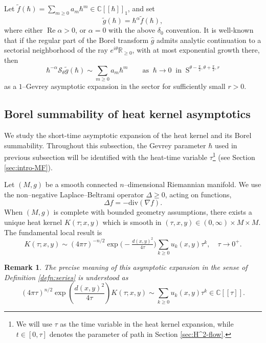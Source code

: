 \documentclass[11pt]{amsart}
\theoremstyle{plain}
\newtheorem{rmk}[thm]{Remark}
\theoremstyle{definition}
\newcommand{\R}{\mathbb{R}}
\newcommand{\C}{\mathbb{C}}
\begin{document}
Let $\widetilde f(\hbar)=\sum\limits_{m\ge0}a_m\hbar^m\in\C[[\hbar]]_1$, and set
\begin{equation*}
\widetilde g(\hbar)=\hbar^\alpha\widetilde f(\hbar),
\end{equation*}
where either $\operatorname{Re}\alpha>0$, or $\alpha=0$ with the above
$\delta_0$ convention. It is well-known that if the regular part of the
Borel transform $\widehat g$ admits analytic continuation to a sectorial
neighborhood of the ray $e^{i\theta}\R_{\ge0}$, with at most
exponential growth there, then 
\begin{equation*}
\hbar^{-\alpha}\mathcal S_\theta\widetilde g(\hbar) \sim \sum_{m\ge0}a_m\hbar^m  \quad \quad \text{as } \ \hbar\rightarrow 0 \ \text{ in }\  \text{S}^{\theta-\frac{\pi}{2},\theta+\frac{\pi}2,r}
\end{equation*}
as a $1$--Gevrey asymptotic expansion in the sector for sufficiently small $r>0$.





\subsection{Borel summability of heat kernel asymptotics}\label{subsec:proof-borel-summability} We study the short-time asymptotic expansion of the heat kernel and its Borel summability. Throughout this subsection, the Gevrey parameter $\hbar$ used in previous subsection will be identified with the heat-time variable $\tau$\footnote{We will use $\tau$ as the time variable in the heat kernel expansion, while $t\in[0,\tau]$ denotes the parameter of path in Section \ref{sec:H^2-flow}.} (see Section \ref{sec:intro-MF}). 

Let $(M,g)$ be a smooth connected $n$--dimensional Riemannian manifold. We use the non--negative Laplace--Beltrami
operator $\Delta\ge 0$, acting on functions,
\[
\Delta f=-\mathrm{div}(\nabla f).
\]
When $(M,g)$ is complete with bounded geometry assumptions, there exists a unique heat
kernel $K(\tau;x,y)$ which is smooth in $(\tau,x,y)\in(0,\infty)\times
M\times M$. The fundamental local result is
\[
K(\tau;x,y)\sim(4\pi \tau)^{-n/2}\exp\Big(-\tfrac{d(x,y)^2}{4\tau}\Big)
\sum_{k\ge 0} u_k(x,y)\tau^k,\quad \tau\rightarrow0^+.
\]

\begin{rmk} The precise meaning of  this asymptotic expansion in the sense of Definition \ref{defn:series} is understood as
\begin{equation*}
(4\pi \tau)^{n/2}
\exp\!\left(\frac{d(x,y)^2}{4\tau}\right)
K(\tau;x,y)
\sim
\sum_{k\ge0}u_k(x,y)\tau^k \in \C[[\tau]].
\end{equation*}
\end{rmk}
\end{document}
